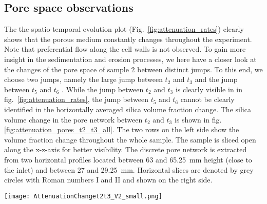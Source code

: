 \documentclass[smallextended]{svjour3}       %
\begin{document}
\subsection{Pore space observations}\label{subsec:porespace}
The the spatio-temporal evolution plot (Fig.~\ref{fig:attenuation_rates}) clearly shows that the porous medium constantly changes throughout the experiment. Note that preferential flow along the cell walls is not observed. To gain more insight in the sedimentation and erosion processes, we here have a closer look at the changes of the pore space of sample 2 between distinct jumps. To this end, we choose two jumps, namely the large jump between $t_2$ and $t_3$ and the jump between $t_5$ and $t_6$ . While the jump between $t_2$ and $t_3$ is clearly visible in in fig.~\ref{fig:attenuation_rates}, the jump between $t_5$ and $t_6$ cannot be clearly identified in the horizontally averaged silica volume fraction change. The silica volume change in the pore network between $t_2$ and $t_3$ is shown in fig.\ref{fig:attenuation_pores_t2_t3_all}. The two rows on the left side show the volume fraction change throughout the whole sample. The sample is sliced open along the x-z-axis for better visibility. The discrete pore network is extracted from two horizontal profiles located between 63 and 65.25~mm height (close to the inlet) and between 27 and 29.25~mm. Horizontal slices are denoted by grey circles with Roman numbers I and II and shown on the right side. 
\begin{figure*}[hbtp]
\texttt{[image: AttenuationChanget2t3\_V2\_small.png]}%
\caption{\label{fig:attenuation_pores_t2_t3_all} Attenuation (and thus volume fraction) changes in the pore channels in sample 2 between $t_2$ and $t_3$. Red colors denote channels with increased attenuation, which corresponds to a decrease in silica content (opening). Blue colors denote channels with a decreased attenuation, which corresponds to an increase in silica content (clogging). The two plots on the left show the attenuation change in the whole sample, where the sample is sliced open along the x-z plane for better visibility. Length units are in mm. Grey circles denote the height at which horizontal profiles with a thickness of 2.26 mm are taken. The pore network of each slice (denoted by roman numbers) is shown in the right column.}
\end{figure*}
\end{document}
